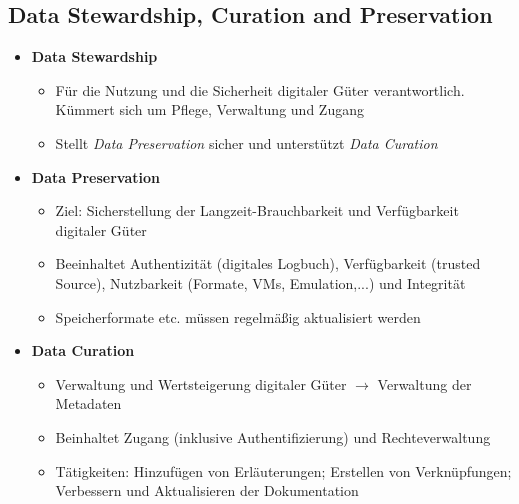 \subsection{Data Stewardship, Curation and Preservation}
\begin{itemize}
	\item \textbf{Data Stewardship}
	\begin{itemize}
		\item Für die Nutzung und die Sicherheit digitaler Güter verantwortlich. Kümmert sich um Pflege, Verwaltung und Zugang
		\item Stellt \textit{Data Preservation} sicher und unterstützt \textit{Data Curation}
	\end{itemize}
	\item \textbf{Data Preservation}
	\begin{itemize}
		\item Ziel: Sicherstellung der Langzeit-Brauchbarkeit und Verfügbarkeit digitaler Güter
		\item Beeinhaltet Authentizität (digitales Logbuch), Verfügbarkeit (trusted Source), Nutzbarkeit (Formate, VMs, Emulation,...) und Integrität
		\item Speicherformate etc. müssen regelmäßig aktualisiert werden
	\end{itemize}
	\item \textbf{Data Curation}
	\begin{itemize}
		\item Verwaltung und Wertsteigerung digitaler Güter \(\rightarrow\) Verwaltung der Metadaten
		\item Beinhaltet Zugang (inklusive Authentifizierung) und Rechteverwaltung
		\item Tätigkeiten: Hinzufügen von Erläuterungen; Erstellen von Verknüpfungen; Verbessern und Aktualisieren der Dokumentation
	\end{itemize}
\end{itemize}


